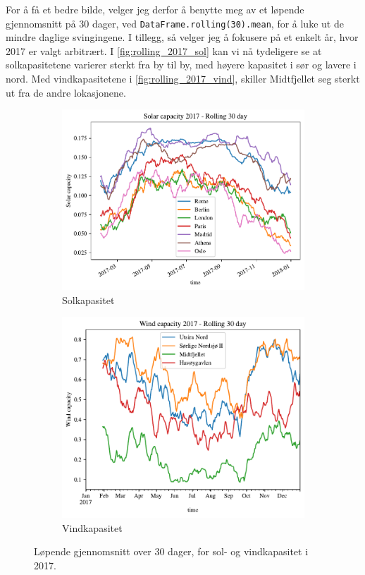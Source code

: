 \documentclass{article}
\begin{document}
For å få et bedre bilde, velger jeg derfor å benytte meg av et løpende gjennomsnitt på 30 dager, ved \verb|DataFrame.rolling(30).mean|, for å luke ut de mindre daglige svingingene.
I tillegg, så velger jeg å fokusere på et enkelt år, hvor 2017 er valgt arbitrært.
I \autoref{fig:rolling_2017_sol} kan vi nå tydeligere se at solkapasitetene varierer sterkt fra by til by, med høyere kapasitet i sør og lavere i nord.
Med vindkapasitetene i \autoref{fig:rolling_2017_vind}, skiller Midtfjellet seg sterkt ut fra de andre lokasjonene.

\begin{figure}[ht]
\centering
\begin{subfigure}{.5\textwidth}
    \centering
    \includegraphics[width=\linewidth]{figures/Solar/Solar capacity 2017 - Rolling 30 day.pdf}
    \caption{Solkapasitet}
    \label{fig:rolling_2017_sol}
\end{subfigure}%
\begin{subfigure}{.5\textwidth}
    \centering
    \includegraphics[width=\linewidth]{figures/Wind/Wind capacity 2017 - Rolling 30 day.pdf}
    \caption{Vindkapasitet}
    \label{fig:rolling_2017_vind}
\end{subfigure}
\caption{Løpende gjennomsnitt over 30 dager, for sol- og vindkapasitet i 2017.}
\label{fig:rolling_2017}
\end{figure}
\end{document}
